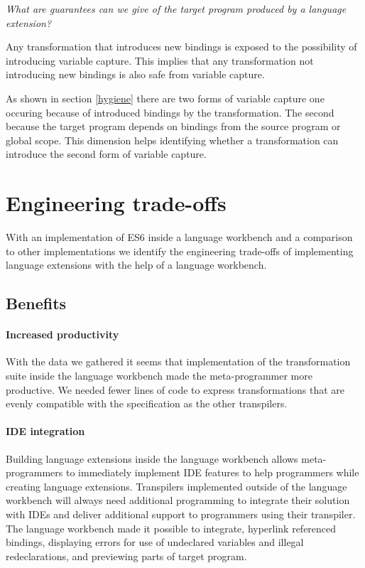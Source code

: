 \textit{What are guarantees can we give of the target program produced by a language extension?}

\begin{description}[font=\normalfont,align=right,leftmargin=!, labelwidth=\widthof{Introduction of bindings},labelsep=2em]
	\item[Introduction of bindings] Any transformation that introduces new bindings is exposed to the possibility of introducing variable capture. This implies that any transformation not introducing new bindings is also safe from variable capture.
	\item[Depending on bindings] As shown in section \ref{hygiene} there are two forms of variable capture one occuring because of introduced bindings by the transformation. The second because the target program depends on bindings from the source program or global scope. This dimension helps identifying whether a transformation can introduce the second form of variable capture.
\end{description}

\section{Engineering trade-offs}

With an implementation of ES6 inside a language workbench and a comparison to other implementations we identify the engineering trade-offs of implementing language extensions with the help of a language workbench.

\subsection{Benefits}

\paragraph{Increased productivity}
With the data we gathered it seems that implementation of the transformation suite inside the language workbench made the meta-programmer more productive. We needed fewer lines of code to express transformations that are evenly compatible with the specification as the other transpilers. 

\paragraph{IDE integration}
Building language extensions inside the language workbench allows meta-programmers to immediately implement IDE features to help programmers while creating language extensions. Transpilers implemented outside of the language workbench will always need additional programming to integrate their solution with IDEs and deliver additional support to programmers using their transpiler. The language workbench made it possible to integrate, hyperlink referenced bindings, displaying errors for use of undeclared variables and illegal redeclarations, and previewing parts of target program. 

